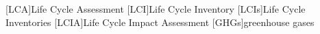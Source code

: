 \begin{acronym}[LCIA]
    [LCA]{Life Cycle Assessment}
    [LCI]{Life Cycle Inventory}
    [LCIs]{Life Cycle Inventories}
    [LCIA]{Life Cycle Impact Assessment}
    [GHGs]{greenhouse gases}
    
\end{acronym}

